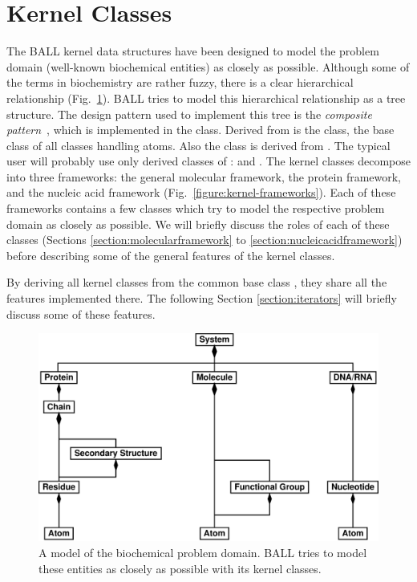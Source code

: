 \section{Kernel Classes}
\label{section:kernelclasses}

The BALL kernel data structures have been designed to model the problem 
domain (\ie well-known biochemical entities) as closely as possible.
Although some of the terms in biochemistry are rather fuzzy, there is a clear
hierarchical relationship (Fig.~\ref{figure:problem-domain}).
BALL tries to model this hierarchical relationship as a tree structure.
The design pattern used to implement this tree is the {\em composite
pattern}~\cite{DesignPatterns}, which is implemented in the 
class. Derived from  is the  class, the
base class of all classes handling atoms. Also the  class is 
derived from . The typical user will probably use only derived
classes of :  and . The kernel
classes decompose into three frameworks: the general molecular framework, the 
protein framework, and the nucleic acid framework 
(Fig.~\ref{figure:kernel-frameworks}).
Each of these frameworks contains a few classes which try to model the
respective problem domain as closely as possible. We will briefly discuss the
roles of each of these classes (Sections \ref{section:molecularframework} to
\ref{section:nucleicacidframework}) before describing some of the general 
features of the kernel classes.

By deriving all kernel classes from the common base class ,
they share all the features implemented there. The following Section 
\ref{section:iterators} will briefly discuss some of these features.

\begin{figure}[tb]
  \centering\includegraphics[width=\textwidth]{problem-domain.eps}
  \caption{A model of the biochemical problem domain. BALL tries to model
           these entities as closely as possible with its kernel classes.}
  \label{figure:problem-domain}
\end{figure}

